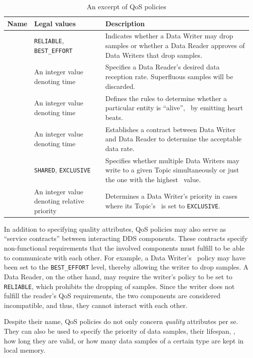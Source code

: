 \begin{table}[H]
  \caption[An excerpt of DDS QoS policies]{An excerpt of QoS policies}\label{tab:qos}
  \centering
  \begin{tabular}{p{} p{}  p{}}
    \toprule
      \textbf{Name} & \textbf{Legal values} & \textbf{Description} \\
    \midrule
    	\reliability  & \texttt{RELIABLE}, \texttt{BEST\_EFFORT} & Indicates whether a Data Writer may drop samples or whether a Data Reader approves of Data Writers that drop samples.\\
    	\tbf  & An integer value denoting time & Specifies a Data Reader's desired data reception rate. Superfluous samples will be discarded.\\
    	\liveliness  & An integer value denoting time & Defines the rules to determine whether a particular entity is ``alive'', \eg\ by emitting heart beats. \\
    	\deadline  & An integer value denoting time & Establishes a contract between Data Writer and Data Reader to determine the acceptable data rate. \\
    	\ownership  & \texttt{SHARED}, \texttt{EXCLUSIVE} & Specifies whether multiple Data Writers may write to a given Topic simultaneously or just the one with the highest \ostrength\  value.\\
    	\ostrength  & An integer value denoting relative priority & Determines a Data Writer's priority in cases where its Topic's \ownership\ is set to \texttt{EXCLUSIVE}. \\
    \bottomrule
  \end{tabular}
\end{table}

In addition to specifying quality attributes, QoS policies may also serve as ``service contracts'' between interacting DDS components. These contracts specify non-functional requirements that the involved components must fulfill to be able to communicate with each other. For example, a Data Writer's \reliability\ policy may have been set to the \texttt{BEST\_EFFORT} level, thereby allowing the writer to drop samples. A Data Reader, on the other hand, may require the writer's policy to be set to \texttt{RELIABLE}, which prohibits the dropping of samples. Since the writer does not fulfill the reader's QoS requirements, the two components are considered incompatible, and thus, they cannot interact with each other.

Despite their name, QoS policies do not only concern \emph{quality} attributes per se. They can also be used to specify the priority of data samples, their lifespan, \ie , how long they are valid, or how many data samples of a certain type are kept in local memory.
%
%
%
%
%
%
%
%
%
%
%
%
